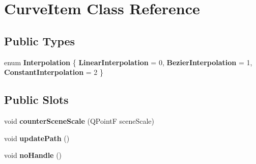 \hypertarget{class_curve_item}{
\section{\-Curve\-Item \-Class \-Reference}
\label{class_curve_item}
}
\subsection*{\-Public \-Types}
\begin{DoxyCompactItemize}
\item 
enum {\bfseries \-Interpolation} \{ {\bfseries \-Linear\-Interpolation} =  0, 
{\bfseries \-Bezier\-Interpolation} =  1, 
{\bfseries \-Constant\-Interpolation} =  2
 \}
\end{DoxyCompactItemize}
\subsection*{\-Public \-Slots}
\begin{DoxyCompactItemize}
\item 
\hypertarget{class_curve_item_ac1c07b01e58ea3360ee253f7b32998ce}{
void {\bfseries counter\-Scene\-Scale} (\-Q\-Point\-F scene\-Scale)}
\label{class_curve_item_ac1c07b01e58ea3360ee253f7b32998ce}

\item 
\hypertarget{class_curve_item_a946ee28a57ab487a17653c4b29520251}{
void {\bfseries update\-Path} ()}
\label{class_curve_item_a946ee28a57ab487a17653c4b29520251}

\item 
\hypertarget{class_curve_item_a2ecb0c62f98642379bc1a52a5be71b24}{
void {\bfseries no\-Handle} ()}
\label{class_curve_item_a2ecb0c62f98642379bc1a52a5be71b24}

\end{DoxyCompactItemize}
